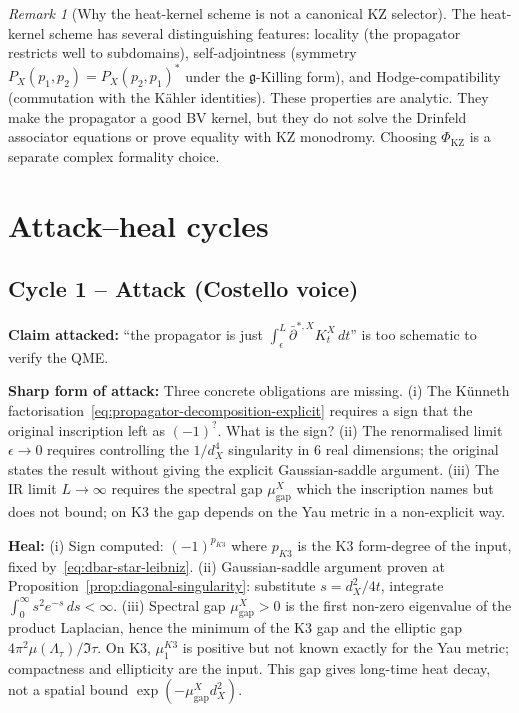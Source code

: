 \documentclass[11pt]{amsart}
\providecommand{\dbar}{\bar\partial}
\providecommand{\frakg}{\mathfrak{g}}
\theoremstyle{definition}
\theoremstyle{remark}
\newtheorem{remark}[theorem]{Remark}
\begin{document}
\begin{remark}[Why the heat-kernel scheme is not a canonical KZ selector]
\label{rem:heat-canonical}
The heat-kernel scheme has several distinguishing features:
locality (the propagator restricts well to subdomains), self-adjointness
(symmetry $P_X(p_1,p_2) = P_X(p_2,p_1)^*$ under the $\frakg$-Killing
form), and Hodge-compatibility (commutation with the K\"ahler
identities). These properties are analytic. They make the propagator a
good BV kernel, but they do not solve the Drinfeld associator equations
or prove equality with KZ monodromy. Choosing $\Phi_{\mathrm{KZ}}$ is a
separate complex formality choice.
\end{remark}

\section{Attack--heal cycles}
\label{sec:attack-heal}

\subsection*{Cycle 1 -- Attack (Costello voice)}

\textbf{Claim attacked:} ``the propagator is just $\int_\epsilon^L
\dbar^{*,X} K_t^X\,dt$'' is too schematic to verify the QME.

\textbf{Sharp form of attack:} Three concrete obligations are missing.
(i) The K\"unneth factorisation~\eqref{eq:propagator-decomposition-explicit}
requires a sign that the original inscription left as $(-1)^?$.
What is the sign? (ii) The renormalised limit
$\epsilon \to 0$ requires controlling the $1/d_X^4$ singularity in
$6$ real dimensions; the original states the result without giving
the explicit Gaussian-saddle argument. (iii) The IR limit $L \to
\infty$ requires the spectral gap $\mu_{\mathrm{gap}}^X$ which the
inscription names but does not bound; on K3 the gap depends on the
Yau metric in a non-explicit way.

\textbf{Heal:}
(i) Sign computed: $(-1)^{p_{K3}}$ where $p_{K3}$ is the K3
form-degree of the input, fixed
by~\eqref{eq:dbar-star-leibniz}.
(ii) Gaussian-saddle argument proven at
Proposition~\ref{prop:diagonal-singularity}: substitute
$s = d_X^2/4t$, integrate $\int_0^\infty s^2 e^{-s}\,ds < \infty$.
(iii) Spectral gap $\mu_{\mathrm{gap}}^X>0$ is the first non-zero
eigenvalue of the product Laplacian, hence the minimum of the K3
gap and the elliptic gap
$4\pi^2\mu(\Lambda_\tau)/\Im\tau$. On K3, $\mu_1^{K3}$ is positive
but not known exactly for the Yau metric; compactness and ellipticity
are the input. This gap gives long-time heat decay, not a spatial
bound $\exp(-\mu_{\mathrm{gap}}^X d_X^2)$.
\end{document}
